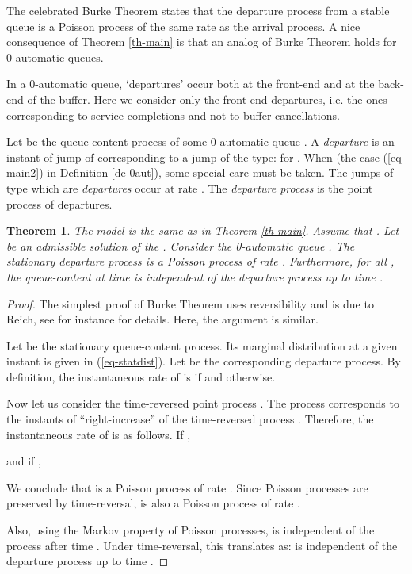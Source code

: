 \documentclass[11pt,a4paper]{article}
\newtheorem{theorem}{Theorem}[section]
\theoremstyle{remark}
\def\eref#1{(\ref{#1})}
\begin{document}
The celebrated Burke Theorem states that the departure process from a
stable  queue is a Poisson process of the same rate as the
arrival process.
A nice consequence of Theorem \ref{th-main} is that an analog
of Burke Theorem holds for 0-automatic
queues.


\medskip

In a 0-automatic queue, `departures' occur both at the front-end and
at the back-end of the buffer. Here we consider only the front-end
departures, i.e. the ones corresponding to service completions and not
to buffer cancellations.

Let  be the queue-content process of some 0-automatic
queue . A {\em departure} is
an instant of jump of  corresponding to a jump of the type:
 for .
When  (the case \eref{eq-main2} in Definition
\ref{de-0aut}), some special care must be taken. The jumps of type
 which are {\em departures} occur at rate
.
The {\em departure process} is the point process of
departures.

\begin{theorem}\label{th-burke}
The model is the same as in Theorem \ref{th-main}. Assume that
. Let  be an admissible solution
of the . Consider the 0-automatic queue
.
The stationary departure process is a Poisson process of rate .
Furthermore, for all , the queue-content at time  is
independent of the departure process up to
time .
\end{theorem}

\begin{proof}
The simplest proof of Burke Theorem uses reversibility and is due to
Reich, see for instance \cite{kell79} for details. Here, the argument
is similar.

Let  be the stationary queue-content process. Its marginal
distribution at a given instant is  given in
\eref{eq-statdist}. Let  be the corresponding departure
process. By definition, the instantaneous rate of  is
 if  and  otherwise.

Now let us consider the time-reversed point process
. The process  corresponds to the
instants of ``right-increase'' of the time-reversed process
. Therefore, the instantaneous rate
 of  is as follows.
If ,

and if ,

We conclude that  is a Poisson process of rate
. Since Poisson processes are preserved by time-reversal, 
is also a Poisson process of rate .

Also, using the Markov property of Poisson processes,
 is independent of the process 
after time . Under time-reversal, this translates as:  is
independent of the departure process  up to time .
\end{proof}
\end{document}
